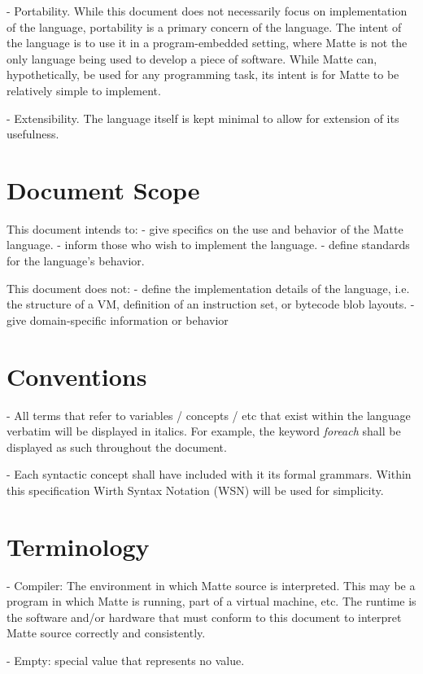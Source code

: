 \documentclass[12pt,letterpaper]{report}
\begin{document}
- Portability. While this document does not necessarily focus on implementation 
  of the language, portability is a primary concern of the language. 
  The intent of the language is to use it in a program-embedded setting, 
  where Matte is not the only language being used to develop a piece of software. 
  While Matte can, hypothetically, be used for any programming task, its intent is 
  for Matte to be relatively simple to implement. 

- Extensibility. The language itself is kept minimal to allow for extension of its 
  usefulness.

\section{Document Scope}

This document intends to:
- give specifics on the use and behavior of the Matte language. 
- inform those who wish to implement the language.
- define standards for the language's behavior.

This document does not:
- define the implementation details of the language, i.e. the 
  structure of a VM, definition of an instruction set, or bytecode blob layouts.
- give domain-specific information or behavior 


\section{Conventions}

- All terms that refer to variables / concepts / etc that exist within the language verbatim will 
  be displayed in italics. For example, the keyword \textit{foreach} shall be displayed as such 
  throughout the document.
  
- Each syntactic concept shall have included with it its formal grammars. Within this specification 
  Wirth Syntax Notation (WSN) will be used for simplicity.


\section{Terminology}

- Compiler: The environment in which Matte source is interpreted. This may be a program in which Matte is running, part of a virtual machine, etc. The runtime is the software and/or hardware that must conform to this document to interpret Matte source correctly and consistently.

- Empty: special value that represents no value. 
\end{document}
